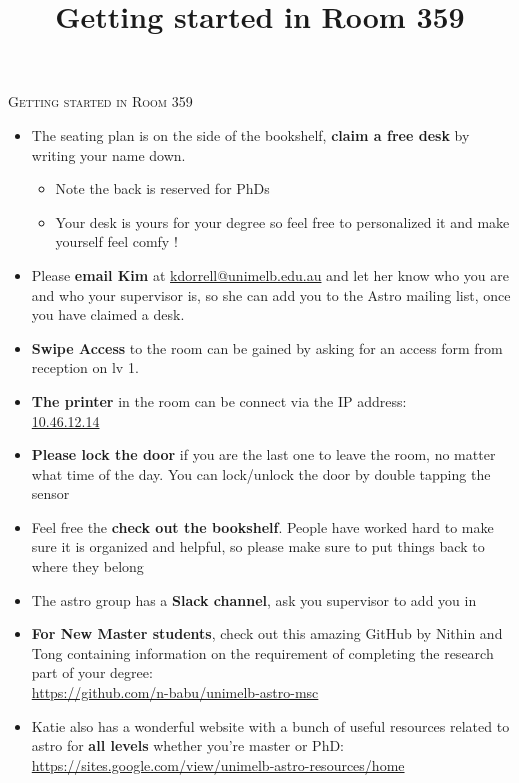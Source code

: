 \documentclass[11pt, oneside, a4paper]{article}
\title{Getting started in Room 359}
\newcommand{\tipscolor}{ForestGreen}
\begin{document}
\pagestyle{fancy}
\thispagestyle{firstpage}                                      
{\centering \LARGE \textsc{Getting started in Room 359} \\}
\vspace{0.5em}

\Large
 
 


\begin{tcolorbox}[colback=red!5!white,colframe=red!50!white,title={Essentials!}]
    \begin{itemize}
        \item The seating plan is on the side of the bookshelf, \textbf{claim a free desk} by writing your name down.
        \begin{itemize}
            \item Note the back is reserved for PhDs
            \item Your desk is yours for your degree so feel free to personalized it and make yourself feel comfy !
        \end{itemize}
        \item Please \textbf{email Kim} at \url{kdorrell@unimelb.edu.au} and let her know who you are and who your supervisor is, so she can add you to the Astro mailing list, once you have claimed a desk.
        \item \textbf{Swipe Access} to the room can be gained by asking for an access form from reception on lv 1.
        \item \textbf{The printer} in the room can be connect via the IP address: \\
        \url{10.46.12.14}
    \end{itemize}
\end{tcolorbox}

\begin{tcolorbox}[colback=\tipscolor!5!white,colframe=\tipscolor!50!white,title={Tips \& Reminders}]
    \begin{itemize}
        \item \textbf{Please lock the door} if you are the last one to leave the room, no matter what time of the day. You can lock/unlock the door by double tapping the sensor
        \item Feel free the \textbf{check out the bookshelf}. People have worked hard to make sure it is organized and helpful, so please make sure to put things back to where they belong 
        \item The astro group has a \textbf{Slack channel}, ask you supervisor to add you in
        \item \textbf{For New Master students}, check out this amazing GitHub by Nithin and Tong containing information on the requirement of completing the research part of your degree:
        \\
        \url{https://github.com/n-babu/unimelb-astro-msc}
        \item Katie also has a wonderful website with a bunch of useful resources related to astro for \textbf{all levels} whether you're master or PhD: 
        \\
        \url{https://sites.google.com/view/unimelb-astro-resources/home}
        \end{itemize}
\end{tcolorbox} 
\end{document}
